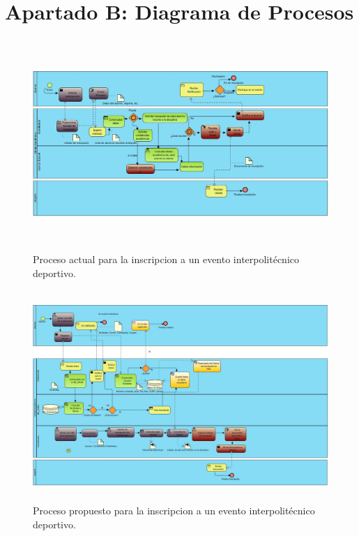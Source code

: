 		

	\section{Apartado B: Diagrama de Procesos}	
		
		\begin{figure}[hbt!]
			\centering
			\includegraphics[width=16cm, height=8cm]{Imagenes/Disenos/ProcesoInscripcionActual.jpg}
			\caption{Proceso actual para la inscripcion a un evento interpolitécnico deportivo.}
			\label{ProcesoInscripcionActual}
		\end{figure}
	
		\begin{figure}[hbt!]
			\centering
			\includegraphics[width=16cm, height=8cm]{Imagenes/Disenos/ProcesoInscripcionPropuesto.jpg}
			\caption{Proceso propuesto para la inscripcion a un evento interpolitécnico deportivo.}
			\label{ProcesoInscripcionPropuesto}
		\end{figure}
	
